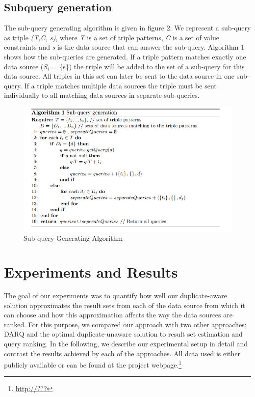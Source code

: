 \documentclass{sig-alternate}  %
\begin{document}
\subsection{Subquery generation}
 The sub-query generating algorithm is given in figure 2. We represent
a sub-query as triple \emph{(T,C, s)}, where \emph{T} is a set of triple patterns,
\emph{C} is a set of value constraints and \emph{s} is the data source that can
answer the sub-query. Algorithm 1 shows how the sub-queries are generated.
If a triple pattern matches exactly one data source ($S_i$
= \{s\}) the triple will be added to the set of a sub-query for this
data source. All triples in this set can later be sent to the data
source in one sub-query. If a triple matches multiple data sources
the triple must be sent individually to all matching data sources
in separate sub-queries.
\begin{figure}
\begin{centering}
\includegraphics[scale=0.7]{img/Algo1} 
\par\end{centering}
\caption{Sub-query Generating Algorithm}
\end{figure}

\section{Experiments and Results}
The goal of our experiments was to quantify how well our duplicate-aware solution approximates the result sets from each of the data source from which it can choose and how this approximation affects the way the data sources are ranked.
For this purpose, we compared our approach with two other approaches: DARQ and the optimal duplicate-unaware solution to result set estimation and query ranking. 
In the following, we describe our experimental setup in detail and contrast the results achieved by each of the approaches.
All data used is either publicly available or can be found at the project webpage.\footnote{\url{http://???}}
\end{document}

